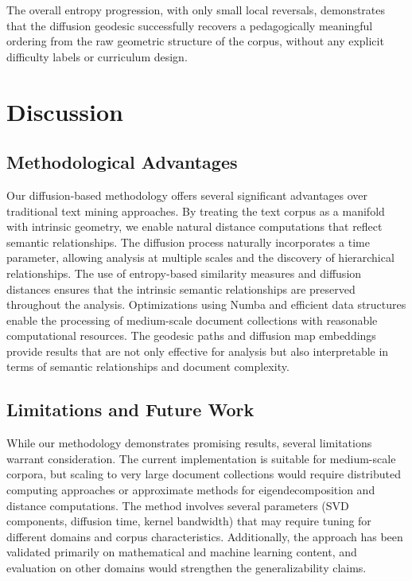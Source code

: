 \documentclass[12pt,a4paper]{article}
\begin{document}
The overall entropy progression, with only small local reversals, demonstrates that the diffusion geodesic successfully recovers a pedagogically meaningful ordering from the raw geometric structure of the corpus, without any explicit difficulty labels or curriculum design.

\section{Discussion}

\subsection{Methodological Advantages}

Our diffusion-based methodology offers several significant advantages over traditional text mining approaches. By treating the text corpus as a manifold with intrinsic geometry, we enable natural distance computations that reflect semantic relationships. The diffusion process naturally incorporates a time parameter, allowing analysis at multiple scales and the discovery of hierarchical relationships. The use of entropy-based similarity measures and diffusion distances ensures that the intrinsic semantic relationships are preserved throughout the analysis. Optimizations using Numba and efficient data structures enable the processing of medium-scale document collections with reasonable computational resources. The geodesic paths and diffusion map embeddings provide results that are not only effective for analysis but also interpretable in terms of semantic relationships and document complexity.

\subsection{Limitations and Future Work}

While our methodology demonstrates promising results, several limitations warrant consideration. The current implementation is suitable for medium-scale corpora, but scaling to very large document collections would require distributed computing approaches or approximate methods for eigendecomposition and distance computations. The method involves several parameters (SVD components, diffusion time, kernel bandwidth) that may require tuning for different domains and corpus characteristics. Additionally, the approach has been validated primarily on mathematical and machine learning content, and evaluation on other domains would strengthen the generalizability claims.
\end{document}
